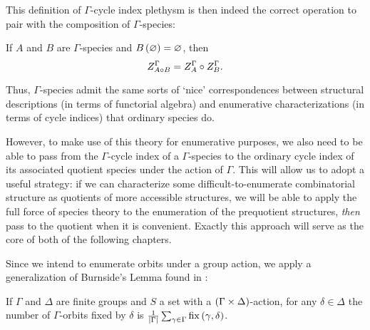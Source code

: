 \documentclass[distribution,draft]{brandiss} %
\numberwithin{section}{chapter}
\numberwithin{figure}{chapter}
\begin{document}
This definition of $\Gamma$-cycle index plethysm is then indeed the correct operation to pair with the composition of $\Gamma$-species:
\begin{theorem}
  \label{thm:gspeccompci}
  If $A$ and $B$ are $\Gamma$-species and $B \left( {\varnothing} \right) = \varnothing$, then
  \begin{equation}
    \label{eq:gspeccompci}
     Z_{A \circ B}^{{\Gamma} {}}  =  Z_{A}^{{\Gamma} {}}  \circ  Z_{B}^{{\Gamma} {}} .
  \end{equation}
\end{theorem}
Thus, $\Gamma$-species admit the same sorts of `nice' correspondences between structural descriptions (in terms of functorial algebra) and enumerative characterizations (in terms of cycle indices) that ordinary species do.

However, to make use of this theory for enumerative purposes, we also need to be able to pass from the $\Gamma$-cycle index of a $\Gamma$-species to the ordinary cycle index of its associated quotient species under the action of $\Gamma$.
This will allow us to adopt a useful strategy: if we can characterize some difficult-to-enumerate combinatorial structure as quotients of more accessible structures, we will be able to apply the full force of species theory to the enumeration of the prequotient structures, \emph{then} pass to the quotient when it is convenient.
Exactly this approach will serve as the core of both of the following chapters.

Since we intend to enumerate orbits under a group action, we apply a generalization of Burnside's Lemma found in \cite[Lemma 5]{gessel:laginvspec}:
\begin{lemma}
  \label{lem:grouporbits}
  If $\Gamma$ and $\Delta$ are finite groups and $S$ a set with a $\left( {\Gamma \times \Delta} \right)$-action, for any $\delta \in \Delta$ the number of $\Gamma$-orbits fixed by $\delta$ is $\frac{1}{\left\vert {\Gamma} \right\vert} \sum_{\gamma \in \Gamma} \operatorname{fix} \left( {\gamma, \delta} \right)$.
\end{lemma}
\end{document}
